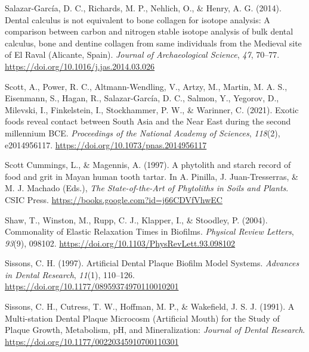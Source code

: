 \documentclass[
  letterpaper,
]{book}
\newlength{\cslhangindent}
\newlength{\cslentryspacingunit} %
\newenvironment{CSLReferences}[2] %
 {%
  \setlength{\parindent}{0pt}
  \ifodd #1
  \let\oldpar\par
  \def\par{\hangindent=\cslhangindent\oldpar}
  \fi
  \setlength{\parskip}{#2\cslentryspacingunit}
 }%
 {}
\begin{document}
\begin{CSLReferences}{1}{0}
\leavevmode{}%
Salazar-García, D. C., Richards, M. P., Nehlich, O., \& Henry, A. G.
(2014). Dental calculus is not equivalent to bone collagen for isotope
analysis: A comparison between carbon and nitrogen stable isotope
analysis of bulk dental calculus, bone and dentine collagen from same
individuals from the {Medieval} site of {El Raval} ({Alicante},
{Spain}). \emph{Journal of Archaeological Science}, \emph{47}, 70--77.
\url{https://doi.org/10.1016/j.jas.2014.03.026}

\leavevmode{}%
Scott, A., Power, R. C., Altmann-Wendling, V., Artzy, M., Martin, M. A.
S., Eisenmann, S., Hagan, R., Salazar-García, D. C., Salmon, Y.,
Yegorov, D., Milevski, I., Finkelstein, I., Stockhammer, P. W., \&
Warinner, C. (2021). Exotic foods reveal contact between {South Asia}
and the {Near East} during the second millennium {BCE}.
\emph{Proceedings of the National Academy of Sciences}, \emph{118}(2),
e2014956117. \url{https://doi.org/10.1073/pnas.2014956117}

\leavevmode{}%
Scott Cummings, L., \& Magennis, A. (1997). A phytolith and starch
record of food and grit in {Mayan} human tooth tartar. In A. Pinilla, J.
Juan-Tresserras, \& M. J. Machado (Eds.), \emph{The {State-of-the-Art}
of {Phytoliths} in {Soils} and {Plants}}. {CSIC Press}.
\url{https://books.google.com?id=j66CDVfVhwEC}

\leavevmode{}%
Shaw, T., Winston, M., Rupp, C. J., Klapper, I., \& Stoodley, P. (2004).
Commonality of {Elastic Relaxation Times} in {Biofilms}. \emph{Physical
Review Letters}, \emph{93}(9), 098102.
\url{https://doi.org/10.1103/PhysRevLett.93.098102}

\leavevmode{}%
Sissons, C. H. (1997). Artificial {Dental Plaque Biofilm Model Systems}.
\emph{Advances in Dental Research}, \emph{11}(1), 110--126.
\url{https://doi.org/10.1177/08959374970110010201}

\leavevmode{}%
Sissons, C. H., Cutress, T. W., Hoffman, M. P., \& Wakefield, J. S. J.
(1991). A {Multi-station Dental Plaque Microcosm} ({Artificial Mouth})
for the {Study} of {Plaque Growth}, {Metabolism}, {pH}, and
{Mineralization}: \emph{Journal of Dental Research}.
\url{https://doi.org/10.1177/00220345910700110301}


\end{CSLReferences}
\end{document}
